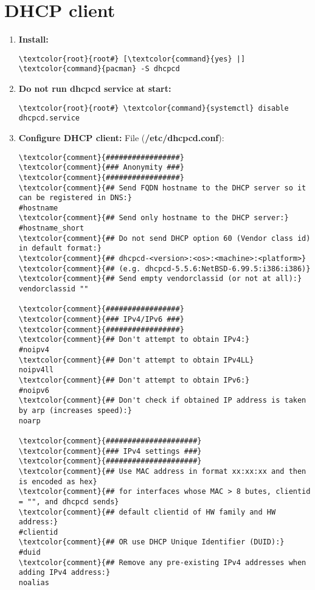 \documentclass[10pt, a4paper, onecolumn, openany]{book} %
\begin{document}
\section{DHCP client}
\begin{enumerate}
    \item \textbf{Install:}
\begin{Verbatim}[commandchars=\\\{\}]
\textcolor{root}{root#} [\textcolor{command}{yes} |] \textcolor{command}{pacman} -S dhcpcd
\end{Verbatim} 
    \item \textbf{Do not run dhcpcd service at start:}
\begin{Verbatim}[commandchars=\\\{\}]
\textcolor{root}{root#} \textcolor{command}{systemctl} disable dhcpcd.service
\end{Verbatim} 
    \item \textbf{Configure DHCP client:}
File (\textbf{\textcolor{file}{/etc/dhcpcd.conf}}):
\begin{Verbatim}[commandchars=\\\{\}]
\textcolor{comment}{#################}
\textcolor{comment}{### Anonymity ###}
\textcolor{comment}{#################}
\textcolor{comment}{## Send FQDN hostname to the DHCP server so it can be registered in DNS:}
#hostname
\textcolor{comment}{## Send only hostname to the DHCP server:}
#hostname_short
\textcolor{comment}{## Do not send DHCP option 60 (Vendor class id) in default format:}
\textcolor{comment}{## dhcpcd-<version>:<os>:<machine>:<platform>} 
\textcolor{comment}{## (e.g. dhcpcd-5.5.6:NetBSD-6.99.5:i386:i386)}
\textcolor{comment}{## Send empty vendorclassid (or not at all):}
vendorclassid ""

\textcolor{comment}{#################}
\textcolor{comment}{### IPv4/IPv6 ###}
\textcolor{comment}{#################}
\textcolor{comment}{## Don't attempt to obtain IPv4:}
#noipv4
\textcolor{comment}{## Don't attempt to obtain IPv4LL}
noipv4ll
\textcolor{comment}{## Don't attempt to obtain IPv6:}
#noipv6
\textcolor{comment}{## Don't check if obtained IP address is taken by arp (increases speed):}
noarp

\textcolor{comment}{#####################}
\textcolor{comment}{### IPv4 settings ###}
\textcolor{comment}{#####################}
\textcolor{comment}{## Use MAC address in format xx:xx:xx and then is encoded as hex}
\textcolor{comment}{## for interfaces whose MAC > 8 butes, clientid = "", and dhcpcd sends}
\textcolor{comment}{## default clientid of HW family and HW address:}
#clientid
\textcolor{comment}{## OR use DHCP Unique Identifier (DUID):}
#duid
\textcolor{comment}{## Remove any pre-existing IPv4 addresses when adding IPv4 address:}
noalias


\end{Verbatim}
\end{enumerate}
\end{document}
